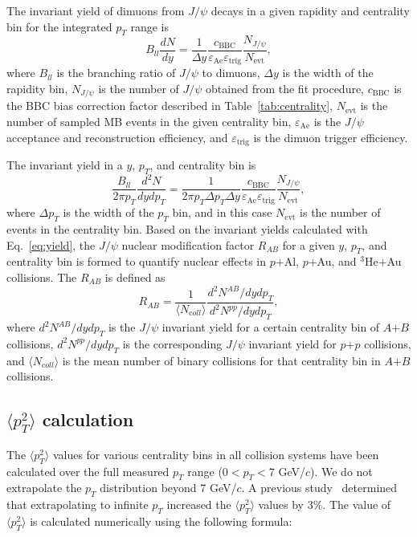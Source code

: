 \documentclass[twocolumn,letterpaper,aps,prc,longbibliography,superscriptaddress,nofootinbib,floatfix]{revtex4-1}
\newcommand{\pt}{\mbox{$p_T$}\xspace}
\newcommand{\ncoll}{\mbox{$N_{\mathrm coll}$}\xspace}
\newcommand{\meanptsq}{\mbox{$\langle p_T^2 \rangle$}\xspace}
\newcommand{\pp}{\mbox{$p$$+$$p$}\xspace}
\newcommand{\pau}{\mbox{$p$$+$Au}\xspace}
\newcommand{\pal}{\mbox{$p$$+$Al}\xspace}
\newcommand{\heau}{\mbox{$^{3}$He$+$Au}\xspace}
\newcommand{\jpsi}{\mbox{$J/\psi$}\xspace}
\begin{document}
The invariant yield of dimuons from \jpsi decays in a given rapidity and 
centrality bin for the integrated \pt range is
\begin{equation}
\label{eq:yield_rap}
 B_{ll}\frac{dN}{dy} = \frac{1}{\Delta y} \frac{ c_\mathrm{BBC}}{ \varepsilon_\mathrm{Ae} \varepsilon_\mathrm{trig}}\frac{N_{J/\psi}}{N_\mathrm{evt}},    
\end{equation}
where $B_{ll}$ is the branching ratio of \jpsi to dimuons, $\Delta y$ is 
the width of the rapidity bin, $N_{J/\psi}$ is the number of \jpsi 
obtained from the fit procedure, $c_\mathrm{BBC}$ is the BBC bias 
correction factor described in Table~\ref{tab:centrality}, 
$N_\mathrm{evt}$ is the number of sampled MB events in the given 
centrality bin, $\varepsilon_\mathrm{Ae}$ is the \jpsi acceptance and 
reconstruction efficiency, and $\varepsilon_\mathrm{trig}$ is the dimuon 
trigger efficiency.

The invariant yield in a $y$, \pt, and centrality bin is
\begin{equation}
\label{eq:yield}
 \frac{B_{ll}}{2\pi p_T} \frac{d^{2}N}{dydp_T} = \frac{1}{2\pi \pt 
\Delta\pt \Delta y} \frac{c_\mathrm{BBC}}{\varepsilon_\mathrm{Ae} 
\varepsilon_\mathrm{trig}} \frac{N_{J/\psi}}{N_\mathrm{evt}},
\end{equation}
where $\Delta \pt$ is the width of the \pt bin, and in this case 
$N_\mathrm{evt}$ is the number of events in the centrality bin.
Based on the invariant yields calculated with Eq.~\ref{eq:yield}, the 
\jpsi nuclear modification factor $R_{AB}$ for a given $y$, \pt, and 
centrality bin is formed to quantify nuclear effects in \pal, \pau, and 
\heau collisions. The $R_{AB}$ is defined as
\begin{equation}
\label{eq:rab}
    R_{AB} = \frac{1}{\langle \ncoll 
\rangle}\frac{d^{2}N^{AB}/dydp_T}{d^{2}N^{pp}/dydp_T},
\end{equation}
where $d^2N^{AB}/dyd\pt$ is the \jpsi invariant yield for a certain 
centrality bin of $A$$+$$B$ collisions, $d^2N^{pp}/dyd\pt$ is the 
corresponding \jpsi invariant yield for \pp collisions, and $\langle 
\ncoll \rangle$ is the mean number of binary collisions for that 
centrality bin in $A$$+$$B$ collisions.


\subsection{\meanptsq calculation}

The \meanptsq values for various centrality bins in all collision 
systems have been calculated over the full measured \pt range ($0<\pt<7$ 
GeV/$c$). We do not extrapolate the \pt distribution beyond 7 GeV/$c$. A 
previous study~\cite{Adare:2012qf} determined that extrapolating to 
infinite \pt increased the \meanptsq values by 3\%. The value of 
\meanptsq is calculated numerically using the following formula:
\end{document}
